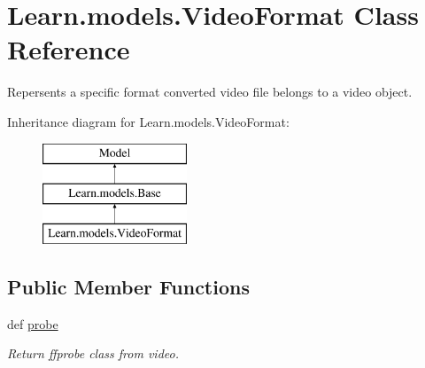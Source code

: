 \hypertarget{class_learn_1_1models_1_1_video_format}{\section{Learn.\-models.\-Video\-Format Class Reference}
\label{class_learn_1_1models_1_1_video_format}
}


Repersents a specific format converted video file belongs to a video object.  


Inheritance diagram for Learn.\-models.\-Video\-Format\-:\begin{figure}[H]
\begin{center}
\leavevmode
\includegraphics[height=3.000000cm]{class_learn_1_1models_1_1_video_format}
\end{center}
\end{figure}
\subsection*{Public Member Functions}
\begin{DoxyCompactItemize}
\item 
def \hyperlink{class_learn_1_1models_1_1_video_format_a47585f10ca027ae67635924ec4fd616a}{probe}
\begin{DoxyCompactList}\small\item\em Return ffprobe class from video. \end{DoxyCompactList}\end{DoxyCompactItemize}
